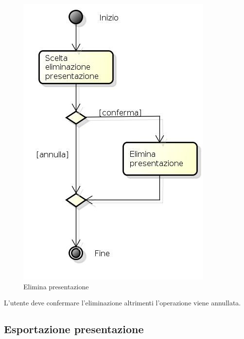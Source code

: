 \begin{figure}[h!]
		\centering
		\includegraphics[scale=.5]{img/Elimina_presentazione.jpg}
		\caption{Elimina presentazione}
		\label{fig:Elimina_presentazione}
\end{figure}  

L'utente deve confermare l'eliminazione altrimenti l'operazione viene annullata.

\newpage

\subsection{Esportazione presentazione}

